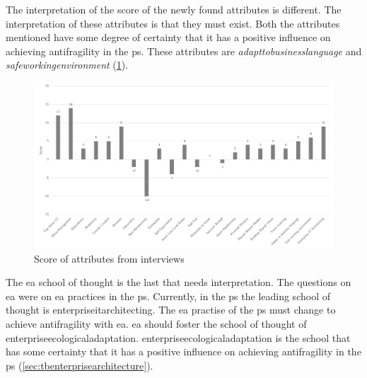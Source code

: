The interpretation of the score of the newly found \glspl{attribute} is different. The interpretation of these \glspl{attribute} is that they must exist. Both the \glspl{attribute} mentioned have some degree of certainty that it has a positive influence on achieving \gls{antifragility} in the \gls{ps}. These attributes are \textit{\gls{adapttobusinesslanguage}} and \textit{\gls{safeworkingenvironment}} (\cref{fig:scoreofattributes}).
\begin{figure}[H]
	\centering
	\includegraphics[width=\textwidth]{images/scoreofattributes}
	\caption[Score of attributes from interviews]{Score of attributes from interviews}
	\label{fig:scoreofattributes}
\end{figure}
The \acrshort{ea} school of thought is the last that needs interpretation. The questions on \acrshort{ea} were on \acrshort{ea} practices in the \gls{ps}. Currently, in the \gls{ps} the leading school of thought is \gls{enterpriseitarchitecting}. The \acrshort{ea} practise of the \gls{ps} must change to achieve \gls{antifragility} with \acrshort{ea}. \acrshort{ea} should foster the school of thought of \gls{enterpriseecologicaladaptation}. \Gls{enterpriseecologicaladaptation} is the school that has some certainty that it has a positive influence on achieving \gls{antifragility} in the \gls{ps}  (\cref{sec:tbenterprisearchitecture}).
